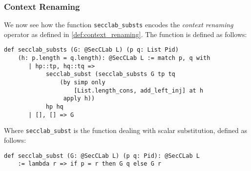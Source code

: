 \documentclass[12pt,a4paper,twoside]{book}
\begin{document}
\subsubsection{Context Renaming}
We now see how the function \texttt{secclab\_substs} encodes the \emph{context renaming} operator as defined in \ref{def:context_renaming}. The function is defined as follows:
\begin{samepage}
\begin{verbatim}
def secclab_substs (G: @SecCLab L) (p q: List Pid)
    (h: p.length = q.length): @SecCLab L := match p, q with
       | hp::tp, hq::tq =>
            secclab_subst (secclab_substs G tp tq
                (by simp only 
                    [List.length_cons, add_left_inj] at h
                 apply h))
            hp hq
       | [], [] => G
\end{verbatim}
\end{samepage}
Where \texttt{secclab\_subst} is the function dealing with scalar substitution, defined as follows:
\begin{samepage}
\begin{verbatim}
def secclab_subst (G: @SecCLab L) (p q: Pid): @SecCLab L
    := lambda r => if p = r then G q else G r
\end{verbatim}
\end{samepage}
\end{document}
